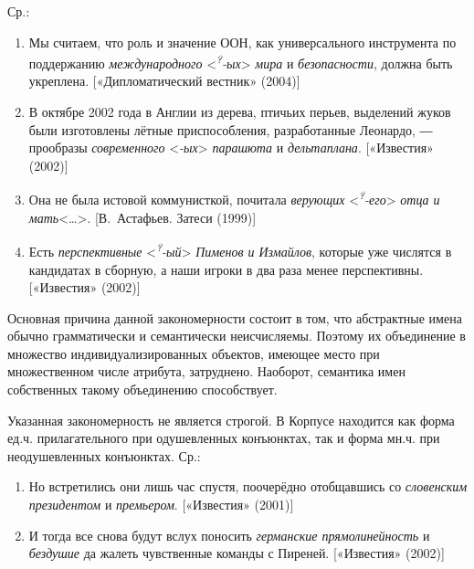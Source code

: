 Ср.:

\begin{enumerate}
  \def\labelenumi{(\arabic{enumi})}
  \setcounter{enumi}{127}
  \item
        Мы считаем, что роль и значение ООН, как универсального инструмента по
        поддержанию \textit{международного}
        \textless{}\textit{\textsuperscript{?}-ых}\textgreater{} \textit{мира} и
        \textit{безопасности}, должна быть укреплена. {[}«Дипломатический
        вестник» (2004){]}
  \item
        В октябре 2002 года в Англии из дерева, птичьих перьев, выделений
        жуков были изготовлены лётные приспособления, разработанные Леонардо,
        ― прообразы \textit{современного} \textless{}\textit{-ых}\textgreater{}
        \textit{парашюта} и \textit{дельтаплана}. {[}«Известия» (2002){]}
  \item
        Она не была истовой коммунисткой, почитала \textit{верующих}
        \textless{}\textit{\textsuperscript{?}-его}\textgreater{} \textit{отца и
          мать}\textless\ldots\textgreater. {[}В.~Астафьев. Затеси (1999){]}
  \item
        Есть \textit{перспективные}
        \textless{}\textit{\textsuperscript{?}-ый}\textgreater{} \textit{Пименов и
          Измайлов}, которые уже числятся в кандидатах в сборную, а наши игроки
        в два раза менее перспективны. {[}«Известия» (2002){]}
\end{enumerate}

Основная причина данной закономерности состоит в том, что абстрактные
имена обычно грамматически и семантически неисчисляемы. Поэтому их
объединение в множество индивидуализированных объектов, имеющее место
при множественном числе атрибута, затруднено. Наоборот, семантика имен
собственных такому объединению способствует.

Указанная закономерность не является строгой. В Корпусе находится как
форма ед.ч. прилагательного при одушевленных конъюнктах, так и форма
мн.ч. при неодушевленных конъюнктах. Ср.:

\begin{enumerate}
  \def\labelenumi{(\arabic{enumi})}
  \setcounter{enumi}{131}
  \item
        Но встретились они лишь час спустя, поочерёдно отобщавшись со
        \textit{словенским президентом} и \textit{премьером}. {[}«Известия»
        (2001){]}
  \item
        И тогда все снова будут вслух поносить \textit{германские
          прямолинейность} и \textit{бездушие} да жалеть чувственные команды с
        Пиреней. {[}«Известия» (2002){]}
\end{enumerate}


